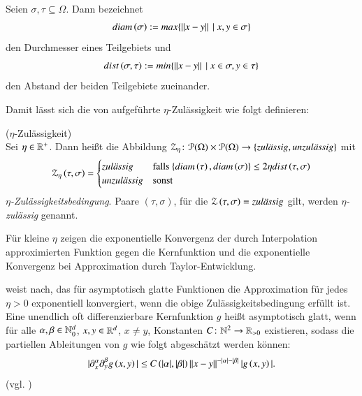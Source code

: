       Seien $\sigma, \tau \subseteq \Omega$. Dann bezeichnet
      \begin{equation*}
	diam\left(\sigma\right) := max\{ \left\lVert x-y\right\rVert \ | \ x, y \in \sigma \}
      \end{equation*}
      den Durchmesser eines Teilgebiets und
      \begin{equation*}
	dist\left(\sigma, \tau\right) := min\{ \left\lVert x-y\right\rVert \ | \ x \in \sigma, y \in \tau \}
      \end{equation*}
      den Abstand der beiden Teilgebiete zueinander. 
      
      Damit lässt sich die von \citet{h2diss} aufgeführte $\eta$-Zuläs\-sig\-keit wie folgt definieren:
      
      \begin{defn}
	($\eta$-Zulässigkeit)\\
	Sei $\eta \in \mathbb{R}^{+}$. Dann heißt die Abbildung $\mathcal{Z}_\eta \colon \mathcal{P}(\Omega) \times \mathcal{P}(\Omega) \to \{\text{\textit{zulässig}},\text{\textit{unzulässig}}\}$ mit 
	\begin{equation*}
	  \mathcal{Z}_\eta \left( \tau, \sigma \right) = 
	  \begin{cases}
	    \text{\textit{zulässig}}   & \text{falls }\{diam\left(\tau \right), diam\left( \sigma \right)\} \le 2 \eta dist\left( \tau , \sigma \right)\\
	    \text{\textit{unzulässig}} & \text{sonst}
	  \end{cases}
	\end{equation*}
	\textit{$\eta$-Zulässigkeitsbedingung}. Paare $\left(\tau, \sigma\right)$, für die $\mathcal{Z}\left(\tau, \sigma\right) = \text{\textit{zulässig}}$ gilt, werden \textit{$\eta$-zulässig} genannt.
      \end{defn}

      Für kleine $\eta$ zeigen \citet{h2approxint} die exponentielle Konvergenz der durch Interpolation approximierten Funktion gegen die Kernfunktion und \citet{h2diss} die exponentielle Konvergenz
      bei Approximation durch Taylor-Entwicklung.
      
      \citet{nichtlokop} weist nach, das für asymptotisch glatte Funktionen die Approximation für jedes $\eta > 0$ exponentiell konvergiert, wenn die obige Zulässigkeitsbedingung erfüllt ist.
      Eine unendlich oft differenzierbare Kernfunktion $g$ heißt asymptotisch glatt, wenn für alle $\alpha , \beta \in \mathbb{N}_0^d$, $x , y \in \mathbb{R}^d$, $x \neq y$, Konstanten $C \colon \mathbb{N}^2 \to \mathbb{R}_{> 0}$
      existieren, sodass die partiellen Ableitungen von $g$ wie folgt abgeschätzt werden können:
      \begin{equation*}
	|\partial_x^\alpha \partial_y^\beta g\left(x,y\right)| \leq C\left( |\alpha| , |\beta| \right) \left\lVert x - y \right\rVert^{-|\alpha| -|\beta|} | g\left( x,y \right) |.
      \end{equation*}
      (vgl. \citet{h2approxint})
      
